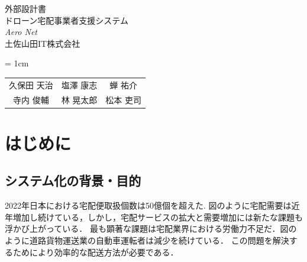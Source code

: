 \documentclass[a4paper, titlepage]{jsarticle}
\date{\today}
\newcommand{\system}{\textsl{Aero Net}}
\begin{document}
\begin{titlepage}
  \centering
  \vspace*{150truept}
  {\Large 外部設計書}\\
  \vspace*{50truept}
  {\Huge ドローン宅配事業者支援システム} \\
  \vspace{15truept}
  {\Huge \system} \\
  \vspace{50truept}
  {\LARGE 土佐山田IT株式会社}\\
  \vspace{20truept}
  {\large{\tabcolsep = 1cm
      \begin{tabular}{ccc}
        久保田 天治 & 塩澤 康志 & 蝉 祐介  \\
        寺内 俊輔  & 林 晃太郎 & 松本 吏司
      \end{tabular}
    }}
\end{titlepage}
\newcommand{\fig}[2]{
  \begin{figure}[H]
    \centering
    \texttt{[image: flow/\#1.pdf]}
    \caption{#2}
    \label{fig:#1}
  \end{figure}
}
\newcommand{\ui}[2]{
  \begin{figure}[H]
    \centering
    \texttt{[image: ui/\#1]}
    \caption{#2}
    \label{fig:#1}
  \end{figure}
}

\tableofcontents

\clearpage

\section{はじめに}
\subsection{システム化の背景・目的}
2022年日本における宅配便取扱個数は50億個を超えた.
図のように宅配需要は近年増加し続けている，しかし，宅配サービスの拡大と需要増加には新たな課題も浮かび上がっている．
最も顕著な課題は宅配業界における労働力不足だ．図のように道路貨物運送業の自動車運転者は減少を続けている．
この問題を解決するためにより効率的な配送方法が必要である．
\end{document}
